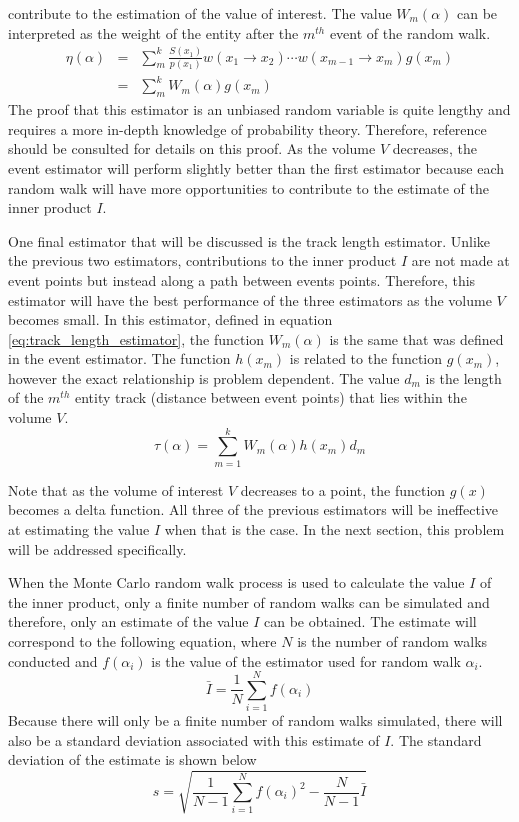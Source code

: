 contribute to the estimation of the value of interest. The value $W_m(\alpha)$
can be interpreted as the weight of the entity after the $m^{th}$ event
of the random walk.
\begin{eqnarray}
  \eta(\alpha) & = & \sum_m^k \frac{S(x_1)}{p(x_1)}w(x_1 \to x_2) \cdots 
  w(x_{m-1} \to x_m) g(x_m) \nonumber \\
  & = & \sum_m^k W_m(\alpha) g(x_m)
  \label{eq:collision_estimator_2}
\end{eqnarray}
The proof that this estimator is an unbiased random variable is quite lengthy 
and requires a more in-depth knowledge of probability theory. Therefore, 
reference \cite{spanier_monte_1969} should be consulted for details on this 
proof. As the volume $V$ decreases, the event estimator will perform slightly
better than the first estimator because each random walk will have more 
opportunities to contribute to the estimate of the inner product $I$. 

One final estimator that will be discussed is the track length estimator.
Unlike the previous two estimators, contributions to the inner product $I$
are not made at event points but instead along a path between events points.
Therefore, this estimator will have the best performance of the three
estimators as the volume $V$ becomes small. In this estimator, defined in 
equation \ref{eq:track_length_estimator}, the function $W_m(\alpha)$ is the 
same that was defined in the event estimator. The function $h(x_m)$ is related 
to the function $g(x_m)$, however the exact relationship is problem dependent. 
The value $d_m$ is the length of the $m^{th}$ entity track (distance between 
event points) that lies within the volume $V$.
\begin{equation}
  \tau(\alpha) = \sum_{m=1}^k W_m(\alpha)h(x_m)d_m
  \label{eq:track_length_estimator}
\end{equation}

Note that as the volume of interest $V$ decreases to a point, the function
$g(x)$ becomes a delta function. All three of the previous estimators will 
be ineffective at estimating the value $I$ when that is the case. In the next
section, this problem will be addressed specifically.

When the Monte Carlo random walk process is used to calculate the value $I$ of
the inner product, only a finite number of random walks can be simulated and
therefore, only an estimate of the value $I$ can be obtained. The estimate will
correspond to the following equation, where $N$ is the number of random walks
conducted and $f(\alpha_i)$ is the value of the estimator used for random
walk $\alpha_i$.
\begin{equation}
  \bar{I} = \frac{1}{N} \sum_{i=1}^N f(\alpha_i)
  \label{eq:inner_product_estimate}
\end{equation}
Because there will only be a finite number of random walks simulated, there
will also be a standard deviation associated with this estimate of $I$. The 
standard deviation of the estimate is shown below
\begin{equation}
  s = \sqrt{\frac{1}{N-1}\sum_{i=1}^N f(\alpha_i)^2 - \frac{N}{N-1}\bar{I}}
  \label{eq:inner_product_stddev}
\end{equation}

